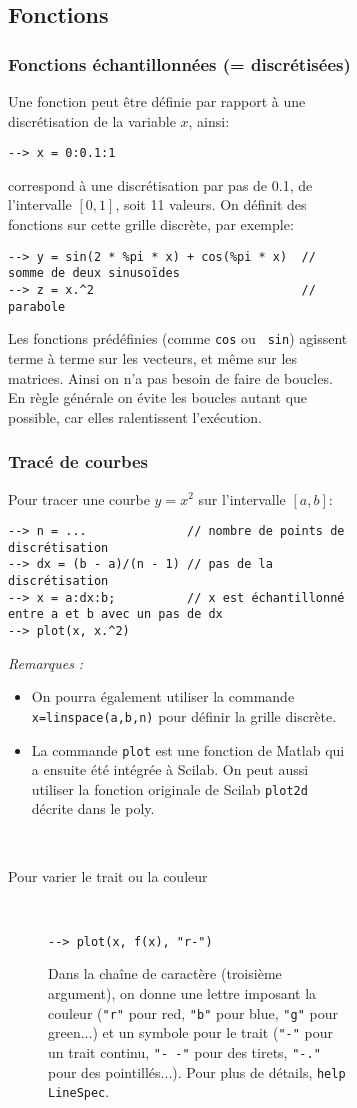 \documentclass[a4paper,11pt]{article}
\begin{document}
\begin{figure}
\begin{figure}
\subsection{Fonctions}

\subsubsection{Fonctions échantillonnées (= discrétisées)}

Une fonction peut être définie par rapport à une discrétisation de la
variable $x$, ainsi:
\begin{verbatim}
--> x = 0:0.1:1
\end{verbatim}
correspond à une discrétisation par pas de 0.1, de l'intervalle
$[0,1]$, soit 11 valeurs. On définit des fonctions sur cette grille
discrète, par exemple:
\begin{verbatim}
--> y = sin(2 * %pi * x) + cos(%pi * x)  // somme de deux sinusoïdes
--> z = x.^2                             // parabole
\end{verbatim}

 Les fonctions prédéfinies (comme {\tt cos} ou {\tt
  sin}) agissent terme à terme sur les vecteurs, et même sur les
matrices. Ainsi on n'a pas besoin de faire de boucles. En règle
générale on évite les boucles autant que possible, car elles
ralentissent l'exécution.

\subsubsection{Tracé de courbes}

Pour tracer une courbe $y=x^2$ sur l'intervalle $[a,b]$:
\begin{verbatim}
--> n = ...              // nombre de points de discrétisation
--> dx = (b - a)/(n - 1) // pas de la discrétisation
--> x = a:dx:b;          // x est échantillonné entre a et b avec un pas de dx
--> plot(x, x.^2)
\end{verbatim}
{\it Remarques :}
\begin{itemize}
\item On pourra également utiliser la commande {\tt x=linspace(a,b,n)}
  pour définir la grille discrète.
\item La commande {\tt plot} est une fonction de Matlab qui a ensuite
  été intégrée à Scilab. On peut aussi utiliser la fonction originale de
  Scilab {\tt plot2d} décrite dans le poly.
\end{itemize}
~
\begin{description}
\item[Pour varier le trait ou la couleur] ~
\begin{verbatim}
--> plot(x, f(x), "r-")
\end{verbatim}
  Dans la chaîne de caractère (troisième argument), on donne une
  lettre imposant la couleur ({\tt "r"} pour red, {\tt "b"} pour blue,
  {\tt "g"} pour green...) et un symbole pour le trait ({\tt "-"} pour un
  trait continu, {\tt "-\,-"} pour des tirets, {\tt "-."} pour des
  pointillés...). Pour plus de détails, {\tt help LineSpec}.


\end{description}
\end{figure}
\end{figure}
\end{document}
